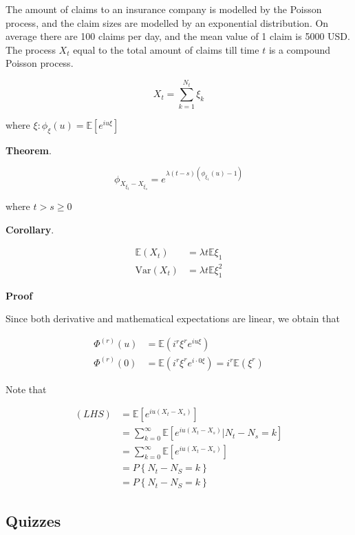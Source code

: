 \documentclass[12pt]{article}
\theoremstyle{nonumberbreak}
\begin{document}
The amount of claims to an insurance company is modelled by the Poisson process, and the claim sizes are modelled by an exponential distribution. On average there are 100 claims per day, and the mean value of 1 claim is 5000 USD. The process $X_t$ equal to the total amount of claims till time $t$ is a compound Poisson process. 


$$
X_t = \sum_{k=1}^{N_t} \xi_k
$$

where $\xi: \phi_\xi (u) = \mathbb{E} [e^{iu\xi} ]$



\begin{theorem}
\textbf{Theorem}.

$$
\phi_{X_{\xi_t} - X_{\xi_s}} = e^{\lambda(t-s) \left( \phi_{\xi_1}(u) - 1 \right)}
$$

where $t > s \ge 0$

\textbf{Corollary}.

$$
\begin{aligned}
\mathbb{E}(X_t) &= \lambda t \mathbb{E} \xi_1 \\[8pt]
\mathrm{Var}(X_t) &= \lambda t \mathbb{E} \xi_1^2
\end{aligned}
$$


\end{theorem}


\textbf{Proof} 

Since both derivative and mathematical expectations are linear, we obtain that

$$
\begin{aligned}
\Phi^{(r)}(u) &= \mathbb{E}(i^r \xi^r e^{iu\xi}) \\[8pt]
\Phi^{(r)}(0) &= \mathbb{E}(i^r \xi^r e^{i\cdot 0 \xi}) = i^r \mathbb{E} (\xi^r)
\end{aligned}
$$

Note that 

$$
\begin{aligned}
(LHS) &= \mathbb{E} \left[ e^{iu (X_t - X_s)} \right] \\[8pt]
&= \sum_{k=0}^\infty \mathbb{E} \left[ e^{iu(X_t - X_s)} \vert N_t - N_s = k \right] \\[8pt]
&= \sum_{k=0}^\infty \mathbb{E} \left[ e^{iu(X_t - X_s)}\right] \\[8pt]
&= P\left\{ N_t - N_S = k \right\} \\[8pt]
&= P\left\{ N_t - N_S = k \right\} 
\end{aligned}
$$



\subsection{Quizzes}
\end{document}
